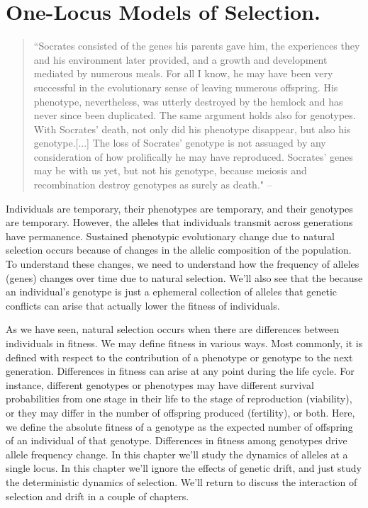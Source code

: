\chapter{One-Locus Models of Selection.}
\label{Chapter:OneLocusSelection}
\begin{quotation}
``Socrates consisted of the genes his parents gave him, the experiences they and his environment later provided, and a growth and development mediated by numerous meals. For all I know, he may have been very successful in the evolutionary sense of leaving numerous offspring. His phenotype, nevertheless, was utterly destroyed by the hemlock and has never since been duplicated. The same argument holds also for genotypes. With Socrates' death, not only did his phenotype disappear, but also his genotype.[...] The loss of Socrates' genotype is not assuaged by any consideration of how prolifically he may have reproduced. Socrates' genes may be with us yet, but not his genotype, because meiosis and recombination destroy genotypes as surely as death." --\citet{Williams:66}
\end{quotation}
  
Individuals are temporary, their phenotypes are temporary, and their
genotypes are temporary. However, the alleles that individuals
transmit across generations have permanence. Sustained phenotypic
evolutionary change due to natural selection occurs because of changes
in the allelic composition of the population. To understand these
changes, we need to understand how the frequency of alleles (genes)
changes over time due to natural selection.  We'll also see that the
because an individual's genotype is just a ephemeral collection of
alleles that genetic conflicts can arise that actually lower the fitness of
individuals. 

As we have seen, natural selection occurs when there are differences between individuals in fitness. We may define fitness in various ways. Most commonly, it is defined with respect to the contribution of a phenotype or genotype to the next generation. 
Differences in fitness can arise at any point during the life
cycle. For instance, different genotypes or phenotypes may have
different survival probabilities from one stage in their life to the
stage of reproduction (viability), or they may differ in the number of
offspring produced (fertility), or both. Here, we define the absolute
fitness of a genotype as the expected number of offspring of an
individual of that genotype. Differences in fitness among genotypes
drive allele frequency change. In this chapter we'll study the
dynamics of alleles at a single locus. In this chapter we'll ignore
the effects of genetic drift, and just study the deterministic
dynamics of selection. We'll return to discuss the interaction of
selection and drift in a couple of chapters.\\


